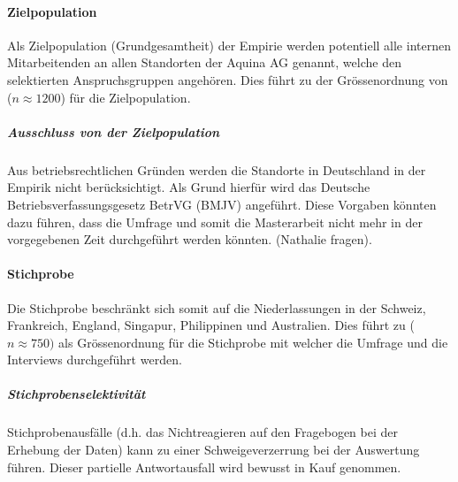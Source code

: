 \documentclass[../../main.tex]{subfiles}
\begin{document}
\paragraph*{Zielpopulation}\mbox{}

\begin{sloppypar}
Als Zielpopulation (Grundgesamtheit) der Empirie werden potentiell alle internen Mitarbeitenden an allen Standorten der Aquina AG genannt, welche den selektierten Anspruchsgruppen angehören. Dies führt zu der Grössenordnung von ($n \approx 1200$) für die Zielpopulation.
\end{sloppypar}

\subparagraph*{Ausschluss von der Zielpopulation}\mbox{}

\begin{sloppypar}
Aus betriebsrechtlichen Gründen werden die Standorte in Deutschland in der Empirik nicht berücksichtigt. Als Grund hierfür wird das  Deutsche Betriebsverfassungsgesetz BetrVG (BMJV) angeführt. Diese Vorgaben könnten dazu führen, dass die Umfrage und somit die Masterarbeit nicht mehr in der vorgegebenen Zeit durchgeführt werden könnten. (Nathalie fragen).
\end{sloppypar}

\paragraph*{Stichprobe}\mbox{}
\begin{sloppypar}
Die Stichprobe beschränkt sich somit auf die Niederlassungen in der Schweiz, Frankreich, England, Singapur, Philippinen und Australien. Dies führt zu ($n \approx 750)$ als Grössenordnung für die Stichprobe mit welcher die Umfrage und die Interviews durchgeführt werden.
\end{sloppypar}

\subparagraph*{Stichprobenselektivität}\mbox{}

\begin{sloppypar}
Stichprobenausfälle (d.h. das Nichtreagieren auf den Fragebogen bei der Erhebung der Daten) kann zu einer Schweigeverzerrung bei der Auswertung führen. Dieser partielle Antwortausfall wird bewusst in Kauf genommen. 
\end{sloppypar}
\end{document}
